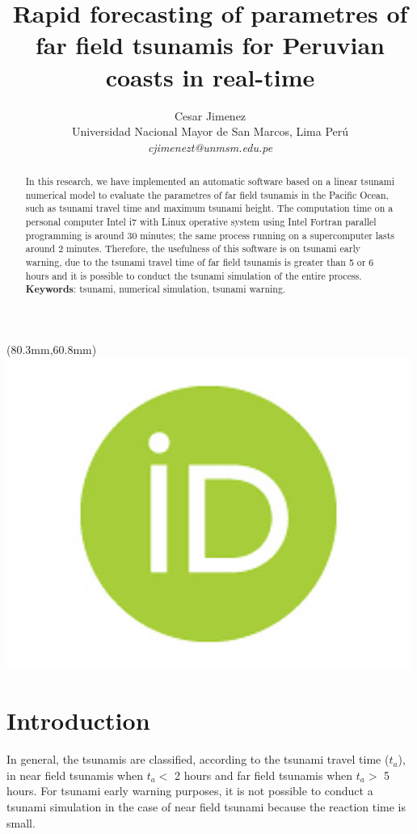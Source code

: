 \documentclass[a4paper,11pt,twoside]{article}
\title{Rapid forecasting of parametres of far field tsunamis for Peruvian coasts in real-time}
\author{Cesar Jimenez\\
 Universidad Nacional Mayor de San Marcos, Lima Perú \\
\emph{cjimenezt@unmsm.edu.pe}\\}
\begin{document}
\maketitle
\begin{textblock*}{297mm}(80.3mm,60.8mm)
	\href{https://orcid.org/0000-0002-3671-4748}{
	\includegraphics[scale=0.033]{orcid}}
\end{textblock*}

\begin{abstract} \noindent
In this research, we have implemented an automatic software based on a linear tsunami numerical model to evaluate the parametres of far field tsunamis in the Pacific Ocean, such as tsunami travel time and maximum tsunami height. The computation time on a personal computer Intel i7 with Linux operative system using Intel Fortran parallel programming is around 30 minutes; the same process running on a supercomputer lasts around 2 minutes. Therefore, the usefulness of this software is on tsunami early warning, due to the tsunami travel time of far field tsunamis is greater than 5 or 6 hours and it is possible to conduct the tsunami simulation of the entire process.  \\ 
\textbf{Keywords}: tsunami, numerical simulation, tsunami warning.
\end{abstract}

\section*{Introduction}
In general, the tsunamis are classified, according to the tsunami travel time ($t_a$), in near field tsunamis when $t_a <$ 2 hours and far field tsunamis when $t_a >$ 5 hours. For tsunami early warning purposes, it is not possible to conduct a tsunami simulation in the case of near field tsunami because the reaction time is small.
\end{document}
